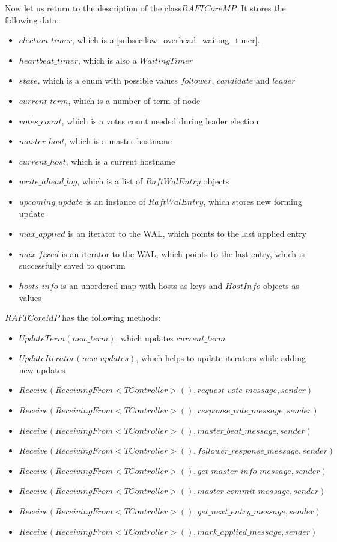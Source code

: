 \documentclass{article}
\newcommand*{\fullref}[1]{\hyperref[{#1}]{\ref*{#1}. \nameref*{#1}}}
\begin{document}
Now let us return to the description of the class$RAFTCoreMP$. It stores the following data:
\begin{itemize}
	\item $election\_timer$, which is a \fullref{subsec:low_overhead_waiting_timer}
	\item $heartbeat\_timer$, which is also a $WaitingTimer$
	\item $state$, which is a enum with possible values $follower$, $candidate$ and $leader$
	\item $current\_term$, which is a number of term of node
	\item $votes\_count$, which is a votes count needed during leader election
	\item $master\_host$, which is a master hostname
	\item $current\_host$, which is a current hostname
	\item $write\_ahead\_log$, which is a list of $RaftWalEntry$ objects
	\item $upcoming\_update$ is an instance of $RaftWalEntry$, which stores new forming update
	\item $max\_applied$ is an iterator to the WAL, which points to the last applied entry
	\item $max\_fixed$ is an iterator to the WAL, which points to the last entry, which is successfully saved to quorum
	\item $hosts\_info$ is an unordered map with hosts as keys and $HostInfo$ objects as values
\end{itemize}

$RAFTCoreMP$ has the following methods:
\begin{itemize}
	\item $UpdateTerm(new\_term)$, which updates $current\_term$
	\item $UpdateIterator(new\_updates)$, which helps to update iterators while adding new updates
	\item $Receive(ReceivingFrom<TController>(), request\_vote\_message, sender)$
	\item $Receive(ReceivingFrom<TController>(), response\_vote\_message, sender)$
	\item $Receive(ReceivingFrom<TController>(), master\_beat\_message, sender)$
	\item $Receive(ReceivingFrom<TController>(), follower\_response\_message, sender)$
	\item $Receive(ReceivingFrom<TController>(), get\_master\_info\_message, sender)$
	\item $Receive(ReceivingFrom<TController>(), master\_commit\_message, sender)$
	\item $Receive(ReceivingFrom<TController>(), get\_next\_entry\_message, sender)$
	\item $Receive(ReceivingFrom<TController>(), mark\_applied\_message, sender)$
\end{itemize}
\end{document}
